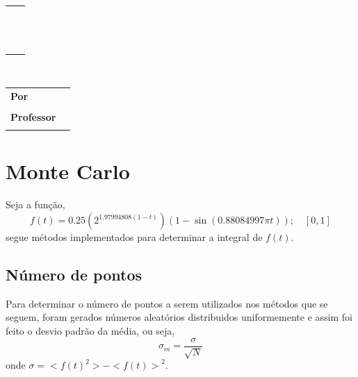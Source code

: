 \documentclass [a4paper,10pt]{article}
\newcommand{\n}[1]{\textbf{#1}}
\begin{document}
  \thispagestyle{fancy}
  \fancyhf{}
  \renewcommand{\footrulewidth}{0.0pt}
  \renewcommand{\headrulewidth}{0.0pt}
  \cfoot{\bfseries \thepage}

  \begin{flushleft}
    \begin{tabular}{ l l }
      \multirow{2}{*}{\rule{0.15\textwidth}{48pt}} & \hspace{-3.5mm}{\large Exercício de Programa 2:}\\[2mm] 
      & \hspace{-3.5mm}{\Huge \n{Método de Monte Carlo}}\\[-3.8mm]
      & \hspace{-4.5mm}\rule{\textwidth}{1.6pt}
    \end{tabular}
  \end{flushleft}
  \begin{center}
    \vspace{-2.5mm}
    \\[0.5cm]
    \hspace{-5.5cm}\begin{tabular}{ l l }
      \n{Por} & \\[-2mm]
      & \hspace{-10mm}{\small Caio Vinícius Dadauto$\qquad$7994808}\\
      \n{Professor} & \\[-2mm]
      & \hspace{-10mm}{\small Julio Michael Stern}\\[4mm]
    \end{tabular}
  \end{center}
  \vspace{1cm}

  \section{Monte Carlo}
  	Seja a função,
  	\begin{equation}
  		f(t) = 0.25(2^{1.97994808(1-t)})(1 - \sin(0.88084997\pi t));\quad [0, 1]
  	\end{equation}
  	segue métodos implementados para determinar a integral de $f(t)$.
  \subsection{Número de pontos}
  	Para determinar o número de pontos a serem utilizados nos métodos que se seguem,
  	foram gerados números aleatórios distribuidos uniformemente e assim foi feito o
  	desvio padrão da média, ou seja,
  	\begin{equation}
  		\sigma_m = \frac{\sigma}{\sqrt{N}}
  	\end{equation}
  	onde $\sigma = <{f(t)}^2> - {<f(t)>}^2$.
  	
\end{document}
